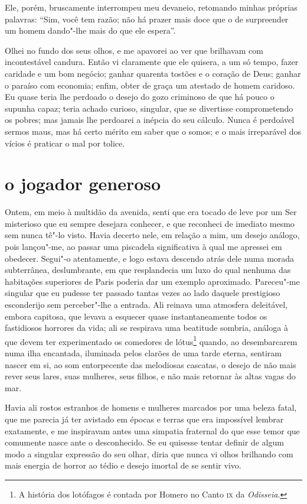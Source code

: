 Ele, porém, bruscamente interrompeu meu devaneio, retomando minhas
próprias palavras: “Sim, você tem razão; não há prazer
mais doce que o de surpreender um homem dando"-lhe mais do que ele
espera''.

Olhei no fundo dos seus olhos, e me apavorei ao ver que
brilhavam com incontestável candura. Então vi claramente que ele
quisera, a um só tempo, fazer caridade e um bom negócio; ganhar quarenta
tostões e o coração de Deus; ganhar o paraíso com economia; enfim,
obter de graça um atestado de homem caridoso. Eu quase teria lhe
perdoado o desejo do gozo criminoso de que há pouco o supunha capaz;
teria achado curioso, singular, que se divertisse comprometendo
os pobres; mas jamais lhe perdoarei a inépcia do seu cálculo. Nunca é
perdoável sermos maus, mas há certo mérito em saber que o somos; e o
mais irreparável dos vícios é praticar o mal por tolice.

\quebra\section[O jogador generoso]{o jogador generoso}

Ontem, em meio à multidão da avenida, senti que era tocado de leve por
um Ser misterioso que eu sempre desejara conhecer, e que reconheci de
imediato mesmo sem nunca tê"-lo visto. Havia decerto nele, em
relação a mim, um desejo análogo, pois lançou"-me, ao passar uma
piscadela significativa à qual me apressei em obedecer. Segui"-o
atentamente, e logo estava descendo atrás dele numa morada subterrânea,
deslumbrante, em que resplandecia um luxo do qual nenhuma das
habitações superiores de Paris poderia dar um exemplo aproximado.
Pareceu"-me singular que eu pudesse ter passado tantas vezes ao lado
daquele prestigioso esconderijo sem perceber"-lhe a entrada. Ali
reinava uma atmosfera deleitável, embora capitosa, que levava a
esquecer quase instantaneamente todos os fastidiosos horrores da
vida; ali se respirava uma beatitude sombria, análoga à que devem ter
experimentado os comedores de lótus\protect\footnote{  A história 
dos lotófagos é contada por Homero no Canto \textsc{ix} da
\textit{Odisseia}.} quando, ao
desembarcarem numa ilha encantada, iluminada pelos clarões de uma tarde
eterna, sentiram nascer em si, ao som entorpecente das melodiosas
cascatas, o desejo de não mais rever seus lares, suas mulheres, seus
filhos, e não mais retornar às altas vagas do mar.

Havia ali rostos estranhos de homens e mulheres marcados por uma beleza
fatal, que me parecia já ter avistado em épocas e terras que era
impossível lembrar exatamente, e me inspiravam antes uma simpatia
fraternal do que esse temor que comumente nasce ante o
desconhecido. Se eu quisesse tentar definir de algum modo a
singular expressão do seu olhar, diria que nunca vi olhos
brilhando com mais energia de horror ao tédio e desejo imortal de
se sentir vivo.

